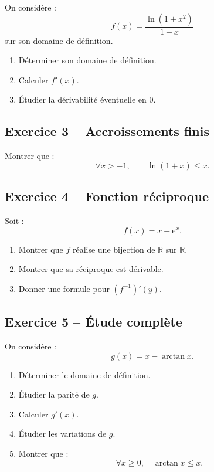 \documentclass[11pt,a4paper]{article}
\newcommand{\R}{\mathbb R}
\newcommand{\e}{\mathrm e}
\begin{document}
On considère :
\[
f(x)=\frac{\ln(1+x^2)}{1+x}
\]
sur son domaine de définition.

\begin{enumerate}
    \item Déterminer son domaine de définition.
    \item Calculer \(f'(x)\).
    \item Étudier la dérivabilité éventuelle en \(0\).
\end{enumerate}

\subsection*{Exercice 3 -- Accroissements finis}

Montrer que :
\[
\forall x> -1,\qquad \ln(1+x)\leq x.
\]

\subsection*{Exercice 4 -- Fonction réciproque}

Soit :
\[
f(x)=x+\e^x.
\]

\begin{enumerate}
    \item Montrer que \(f\) réalise une bijection de \(\R\) sur \(\R\).
    \item Montrer que sa réciproque est dérivable.
    \item Donner une formule pour \((f^{-1})'(y)\).
\end{enumerate}

\subsection*{Exercice 5 -- Étude complète}

On considère :
\[
g(x)=x-\arctan x.
\]

\begin{enumerate}
    \item Déterminer le domaine de définition.
    \item Étudier la parité de \(g\).
    \item Calculer \(g'(x)\).
    \item Étudier les variations de \(g\).
    \item Montrer que :
    \[
    \forall x\geq0,\quad \arctan x\leq x.
    \]
\end{enumerate}

\newpage
\end{document}
